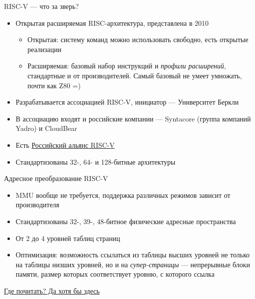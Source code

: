 \documentclass[xetex,aspectratio=43]{beamer}
\begin{document}
\begin{frame}{RISC-V --- что за зверь?}
    \begin{itemize}
        \item Открытая расширяемая RISC-архитектура, представлена в 2010
        \begin{itemize}
            \item Открытая: систему команд можно использовать свободно, есть открытые реализации
            \item Расширяемая: базовый набор инструкций и \emph{профили расширений}, стандартные и от производителей. Самый базовый не умеет умножать, почти как Z80 =)
        \end{itemize}
        \item Разрабатывается ассоциацией RISC-V, инициатор --- Университет Беркли
        \item В ассоциацию входят и российские компании --- Syntacore (группа компаний Yadro) и CloudBear
        \item Есть \href{https://riscv-alliance.ru/}{Российский альянс RISC-V}
        \item Стандартизованы 32-, 64- и 128-битные архитектуры
    \end{itemize}
\end{frame}

\begin{frame}{Адресное преобразование RISC-V}
    \begin{itemize}
        \item MMU вообще не требуется, поддержка различных режимов зависит от производителя
        \item Стандартизованы 32-, 39-, 48-битное физические адресные пространства
        \item От 2 до 4 уровней таблиц страниц
        \item \alert{Оптимизация:} возможность ссылаться из таблицы высших уровней не только на таблицы низших уровней, но и на \emph{супер-страницы} --- непрерывные блоки памяти, размер которых соответствует уровню, с которого ссылка
    \end{itemize}
    \href{https://en.wikipedia.org/wiki/RISC-V\#Privileged_instruction_set}{Где почитать? Да хотя бы здесь}
\end{frame}

\section*{}
\end{document}
